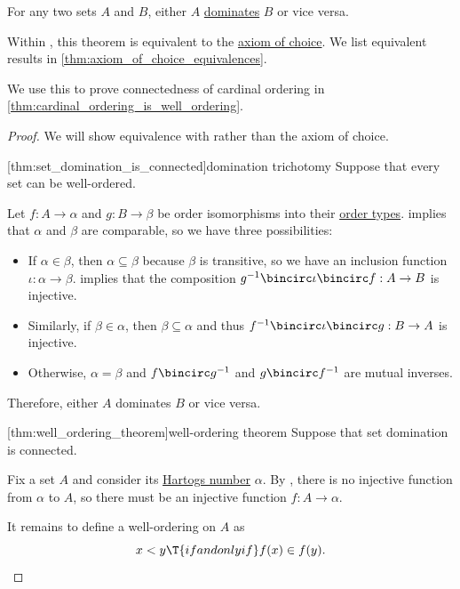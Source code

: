 \begin{theorem}\label{thm:set_domination_is_connected}
  For any two sets \( A \) and \( B \), either \( A \) \hyperref[def:set_domination]{dominates} \( B \) or vice versa.
\end{theorem}
\begin{comments}
  \item Within \hyperref[def:zfc]{}, this theorem is equivalent to the \hyperref[def:zfc/choice]{axiom of choice}. We list equivalent results in \cref{thm:axiom_of_choice_equivalences}.

  \item We use this to prove connectedness of cardinal ordering in \cref{thm:cardinal_ordering_is_well_ordering}.
\end{comments}
\begin{proof}
  We will show equivalence with  rather than the axiom of choice.

  [thm:set_domination_is_connected]{domination trichotomy} Suppose that every set can be well-ordered.

  Let \( f: A \to \alpha \) and \( g: B \to \beta \) be order isomorphisms into their \hyperref[def:well_ordered_order_type]{order types}.  implies that \( \alpha \) and \( \beta \) are comparable, so we have three possibilities:
  \begin{itemize}
    \item If \( \alpha \in \beta \), then \( \alpha \subseteq \beta \) because \( \beta \) is transitive, so we have an inclusion function \( \iota: \alpha \to \beta \).  implies that the composition \( g^{-1} \bincirc \iota \bincirc f: A \to B \) is injective.
    \item Similarly, if \( \beta \in \alpha \), then \( \beta \subseteq \alpha \) and thus \( f^{-1} \bincirc \iota \bincirc g: B \to A \) is injective.
    \item Otherwise, \( \alpha = \beta \) and \( f \bincirc g^{-1} \) and \( g \bincirc f^{-1} \) are mutual inverses.
  \end{itemize}

  Therefore, either \( A \) dominates \( B \) or vice versa.

  [thm:well_ordering_theorem]{well-ordering theorem} Suppose that set domination is connected.

  Fix a set \( A \) and consider its \hyperref[def:hartogs_number]{Hartogs number} \( \alpha \). By , there is no injective function from \( \alpha \) to \( A \), so there must be an injective function \( f: A \to \alpha \).

  It remains to define a well-ordering on \( A \) as
  \begin{equation*}
    x < y \T{if and only if} f(x) \in f(y).
  \end{equation*}
\end{proof}

